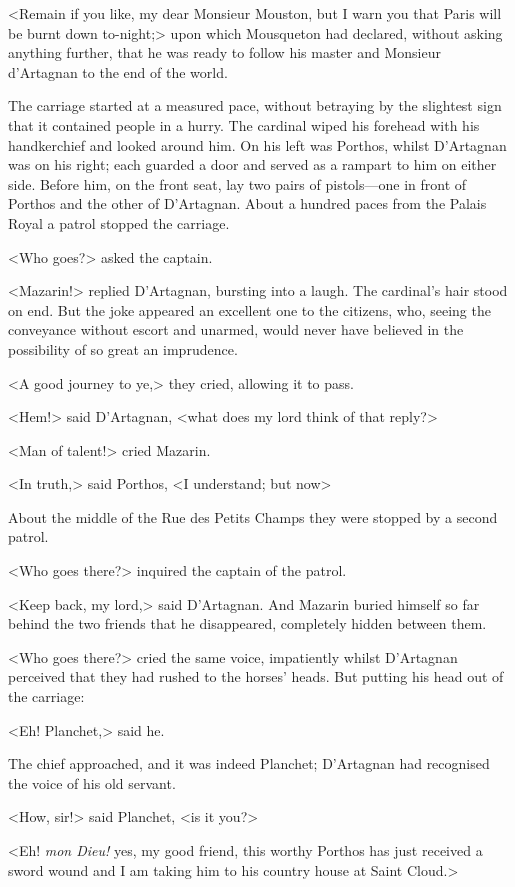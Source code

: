 <Remain if you like, my dear Monsieur Mouston, but I warn you that Paris will be burnt down to-night;> upon which Mousqueton had declared, without asking anything further, that he was ready to follow his master and Monsieur d'Artagnan to the end of the world.

The carriage started at a measured pace, without betraying by the slightest sign that it contained people in a hurry. The cardinal wiped his forehead with his handkerchief and looked around him. On his left was Porthos, whilst D'Artagnan was on his right; each guarded a door and served as a rampart to him on either side. Before him, on the front seat, lay two pairs of pistols—one in front of Porthos and the other of D'Artagnan. About a hundred paces from the Palais Royal a patrol stopped the carriage.

<Who goes?> asked the captain.

<Mazarin!> replied D'Artagnan, bursting into a laugh. The cardinal's hair stood on end. But the joke appeared an excellent one to the citizens, who, seeing the conveyance without escort and unarmed, would never have believed in the possibility of so great an imprudence.

<A good journey to ye,> they cried, allowing it to pass.

<Hem!> said D'Artagnan, <what does my lord think of that reply?>

<Man of talent!> cried Mazarin.

<In truth,> said Porthos, <I understand; but now\longdash>

About the middle of the Rue des Petits Champs they were stopped by a second patrol.

<Who goes there?> inquired the captain of the patrol.

<Keep back, my lord,> said D'Artagnan. And Mazarin buried himself so far behind the two friends that he disappeared, completely hidden between them.

<Who goes there?> cried the same voice, impatiently whilst D'Artagnan perceived that they had rushed to the horses' heads. But putting his head out of the carriage:

<Eh! Planchet,> said he.

The chief approached, and it was indeed Planchet; D'Artagnan had recognised the voice of his old servant.

<How, sir!> said Planchet, <is it you?>

<Eh! \textit{mon Dieu!} yes, my good friend, this worthy Porthos has just received a sword wound and I am taking him to his country house at Saint Cloud.>

